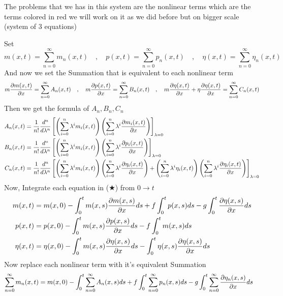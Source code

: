 \documentclass[]{article}
\begin{document}
\begin{example}
    \par
    The problems that we has in this system are the nonlinear terms which are the terms colored in red
    we will work on it as we did before but on bigger scale (system of 3 equations)
    \par
    Set
    \[
        m(x,t) = \sum_{n=0}^{\infty} m_n(x,t)
        \quad , \quad
        p(x,t) = \sum_{n=0}^{\infty} p_n(x,t)
        \quad , \quad
        \eta(x,t) = \sum_{n=0}^{\infty} \eta_n(x,t)
    \]
    And now we set the Summation that is equivalent to each nonlinear term
    \[
        m\pdv{m(x,t)}{x} = \sum_{n=0}^{\infty} A_n(x,t)
        \quad , \quad
        m\pdv{p(x,t)}{x} = \sum_{n=0}^{\infty} B_n(x,t)
        \quad , \quad
        m \pdv{\eta(x,t)}{x} + \eta\pdv{\eta(x,t)}{x} = \sum_{n=0}^{\infty} C_n(x,t)
    \]
    Then we get the formula of $A_n , B_n , C_n$
    \begin{align*}
        A_n(x,t) & = \frac{1}{n!} \frac{d^n}{d\lambda^n} \left[\left(\sum_{i=0}^{n}  \lambda^i m_i(x,t)\right)\left(\sum_{i=0}^{n}  \lambda^i \pdv{m_i(x,t)}{x}\right)\right]_{\lambda = 0}
        \\
        B_n(x,t) & = \frac{1}{n!} \frac{d^n}{d\lambda^n} \left[\left(\sum_{i=0}^{n}  \lambda^i m_i(x,t)\right)\left(\sum_{i=0}^{n}  \lambda^i \pdv{p_i(x,t)}{x}\right)\right]_{\lambda = 0}
        \\
        C_n(x,t) & = \frac{1}{n!} \frac{d^n}{d\lambda^n} \left[\left(\sum_{i=0}^{n}  \lambda^i m_i(x,t)\right)\left(\sum_{i=0}^{n}  \lambda^i \pdv{\eta_i(x,t)}{x}\right) + \left(\sum_{i=0}^{n}  \lambda^i \eta_i(x,t)\right)\left(\sum_{i=0}^{n}  \lambda^i \pdv{\eta_i(x,t)}{x}\right)\right]_{\lambda = 0}
    \end{align*}
    Now, Integrate each equation in ($\bigstar$) from $0 \to t $
    \begin{align*}
        m(x,t)    & = m(x,0) - \int_{0}^{t}m(x,s) \pdv{m(x,s)}{x} ds + f\int_{0}^{t} p(x,s)ds - g\int_{0}^{t}\pdv{\eta(x,s)}{x} ds
        \\
        p(x,t)    & = p(x,0) - \int_{0}^{t} m(x,s) \pdv{p(x,s)}{x} ds - f\int_{0}^{t} m(x,s)ds
        \\
        \eta(x,t) & = \eta(x,0) - \int_{0}^{t} m(x,s) \pdv{\eta(x,s)}{x} ds - \int_{0}^{t} \eta(x,s)\pdv{\eta(x,s)}{x} ds
    \end{align*}
    Now replace each nonlinear term with it's equivalent Summation
    \begin{align*}
        \sum_{n=0}^{\infty} m_n(x,t)    & = m(x,0) - \int_{0}^{t}\sum_{n=0}^{\infty} A_n(x,s)  ds + f\int_{0}^{t} \sum_{n=0}^{\infty} p_n(x,s) ds - g\int_{0}^{t}\sum_{n=0}^{\infty} \pdv{\eta_n(x,s)}{x} ds

\end{align*}
\end{example}
\end{document}
